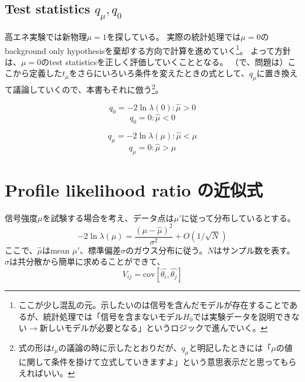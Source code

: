 \documentclass[oneside, uplatex]{jsbook}
\begin{document}
\subsection{Test statistics $q_\mu,q_0$}
高エネ実験では新物理$\mu=1$を探している。
実際の統計処理では$\mu=0$のbackground only hypothesisを棄却する方向で計算を進めていく\footnote{ここが少し混乱の元。示したいのは信号を含んだモデルが存在することであるが、統計処理では「信号を含まないモデル$H_0$では実験データを説明できない$\to$新しいモデルが必要となる」というロジックで進んでいく。}。
よって方針は、$\mu=0$のtest statisticsを正しく評価していくこととなる。
（で、問題は）ここから定義した$t_\mu$をさらにいろいろ条件を変えたときの式として、$q_\mu$に置き換えて議論していくので、本書もそれに倣う\footnote{
式の形は$t_\mu$の議論の時に示したとおりだが、$q_\mu$と明記したときには「$\mu$の値に関して条件を掛けて立式していきますよ」という意思表示だと思ってもらえればいい。}。

\begin{equation}
  q_0 = -2\ln\lambda(0) : \hat{\mu} > 0
\end{equation}
\begin{equation}
  q_0 = 0 : \hat{\mu} < 0
\end{equation}

\begin{equation}
  q_\mu = -2\ln\lambda(\mu) : \hat{\mu} < \mu
\end{equation}
\begin{equation}
  q_\mu = 0 : \hat{\mu} > \mu
\end{equation}

\section{Profile likelihood ratio の近似式}
信号強度$\mu$を試験する場合を考え、データ点は$\mu'$に従って分布しているとする。
\begin{equation}
-2\ln\lambda(\mu) = \frac{(\mu-\hat{\mu})^2}{\sigma^2} + O(1/\sqrt{N})
\end{equation}
ここで、$\hat{\mu}$はmean $\mu'$、標準偏差$\sigma$のガウス分布に従う。$N$はサンプル数を表す。
$\sigma$は共分散から簡単に求めることができて、
\begin{equation}
  V_{ij} = \mathrm{cov}[\hat{\theta_i}, \hat{\theta_j}]
\end{equation}
\end{document}
